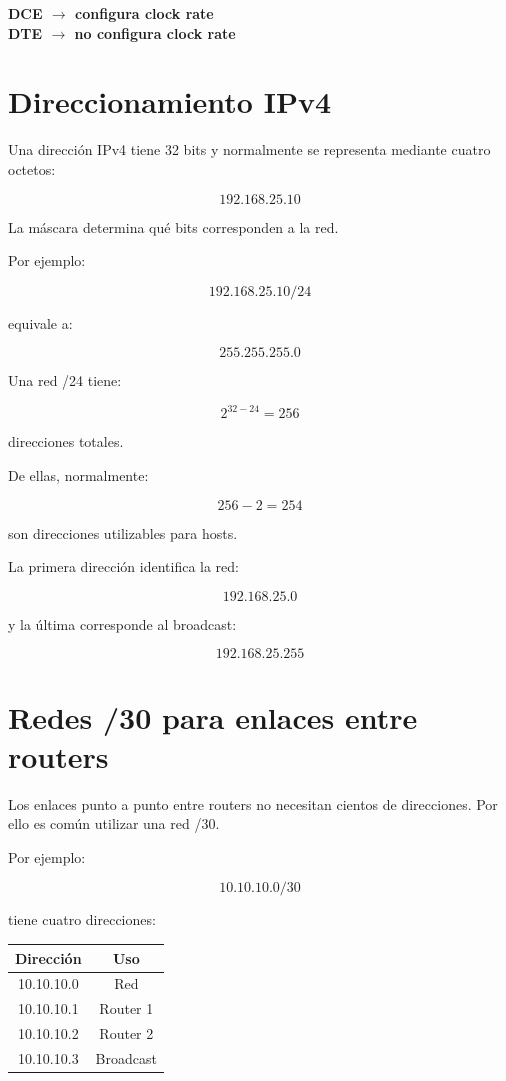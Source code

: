 \documentclass[12pt]{article}
\begin{document}
\begin{center}
\textbf{DCE $\rightarrow$ configura clock rate}\\
\textbf{DTE $\rightarrow$ no configura clock rate}
\end{center}


\section{Direccionamiento IPv4}

Una dirección IPv4 tiene 32 bits y normalmente se representa mediante cuatro
octetos:

\[
192.168.25.10
\]

La máscara determina qué bits corresponden a la red.

Por ejemplo:

\[
192.168.25.10/24
\]

equivale a:

\[
255.255.255.0
\]

Una red /24 tiene:

\[
2^{32-24}=256
\]

direcciones totales.

De ellas, normalmente:

\[
256-2=254
\]

son direcciones utilizables para hosts.

La primera dirección identifica la red:

\[
192.168.25.0
\]

y la última corresponde al broadcast:

\[
192.168.25.255
\]


\section{Redes /30 para enlaces entre routers}

Los enlaces punto a punto entre routers no necesitan cientos de direcciones.
Por ello es común utilizar una red /30.

Por ejemplo:

\[
10.10.10.0/30
\]

tiene cuatro direcciones:

\begin{center}
\begin{tabular}{|c|c|}
\hline
\textbf{Dirección} & \textbf{Uso} \\
\hline
10.10.10.0 & Red \\
10.10.10.1 & Router 1 \\
10.10.10.2 & Router 2 \\
10.10.10.3 & Broadcast \\
\hline
\end{tabular}
\end{center}
\end{document}
